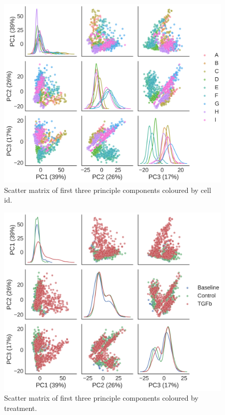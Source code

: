 \documentclass[alpha-refs]{wiley-article}
\begin{document}
\begin{figure}
	\centering
	\includegraphics[height=0.45\textheight]{img/qc/cell_id}
	\caption{Scatter matrix of first three principle components coloured by cell id.}
	\label{fig:qc:cell_id}
\end{figure}

\begin{figure}
	\centering
	\includegraphics[height=0.45\textheight]{img/qc/treatment}
	\caption{Scatter matrix of first three principle components coloured by treatment.}
	\label{fig:qc:treatment}
\end{figure}
\end{document}
